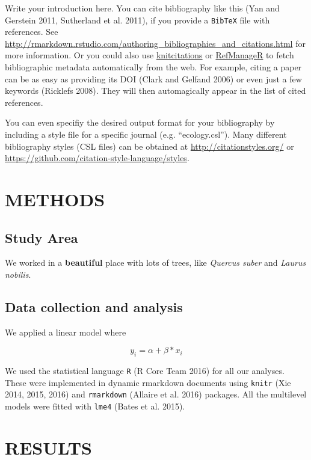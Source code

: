 \documentclass[11pt,a4paper]{article}
\begin{document}
Write your introduction here. You can cite bibliography like this (Yan
and Gerstein 2011, Sutherland et al. 2011), if you provide a
\texttt{BibTeX} file with references. See
\url{http://rmarkdown.rstudio.com/authoring_bibliographies_and_citations.html}
for more information. Or you could also use
\href{https://cran.r-project.org/web/packages/knitcitations/index.html}{knitcitations}
or
\href{https://cran.r-project.org/web/packages/RefManageR/index.html}{RefManageR}
to fetch bibliographic metadata automatically from the web. For example,
citing a paper can be as easy as providing its DOI (Clark and Gelfand
2006) or even just a few keywords (Ricklefs 2008). They will then
automagically appear in the list of cited references.

You can even specifiy the desired output format for your bibliography by
including a style file for a specific journal (e.g. ``ecology.csl'').
Many different bibliography styles (CSL files) can be obtained at
\url{http://citationstyles.org/} or
\url{https://github.com/citation-style-language/styles}.

\section{METHODS}\label{methods}

\subsection{Study Area}\label{study-area}

We worked in a \textbf{beautiful} place with lots of trees, like
\emph{Quercus suber} and \emph{Laurus nobilis}.

\subsection{Data collection and
analysis}\label{data-collection-and-analysis}

We applied a linear model where

\[
y_{i} = \alpha + \beta*x_{i} 
\]

We used the statistical language \texttt{R} (R Core Team 2016) for all
our analyses. These were implemented in dynamic rmarkdown documents
using \texttt{knitr} (Xie 2014, 2015, 2016) and \texttt{rmarkdown}
(Allaire et al. 2016) packages. All the multilevel models were fitted
with \texttt{lme4} (Bates et al. 2015).

\section{RESULTS}\label{results}
\end{document}
